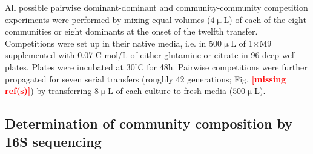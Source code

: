 \documentclass[a4paper,10pt]{article}
\newcommand{\mr}{\textcolor{red}{\textbf{[missing ref(s)]}}}
\begin{document}
All possible pairwise dominant-dominant and community-community
competition experiments
were performed by mixing equal volumes ($4\upmu$L) of each of the eight
communities or eight dominants at the onset of the twelfth transfer.
Competitions were set up in their native media,
i.e. in $500\upmu$L of 1$\times$M9 supplemented with 0.07 C-mol/L of
either glutamine or citrate in 96 deep-well plates.
Plates were incubated at $30^\circ$C for 48h.
Pairwise competitions were further propagated for seven serial transfers
(roughly 42 generations; Fig. \mr) by transferring $8\upmu$L of
each culture to fresh media ($500\upmu$L).

\subsection*{Determination of community composition by 16S sequencing}
\label{methods:sequencing}
\end{document}
